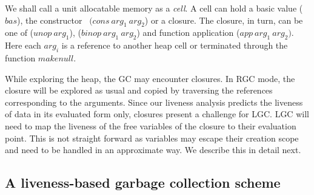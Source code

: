 \documentclass[9pt]{sigplanconf}
\begin{document}
We shall call  a unit allocatable memory as a {\em  cell}.  A cell can
hold  a  basic  value   ($\mathit{bas}$),  the  constructor  \CONS\  $(\mathit{cons~
arg_1~arg_2}$) or   a closure.  The closure, in  turn, can be  one of
($\mathit{unop~arg_1}$),  ($\mathit{ binop~arg_1~arg_2}$)  and  function  application
($\mathit{app~arg_1~arg_2})$.  Here each $\mathit{ arg_i}$ is a reference to another heap
cell or terminated through the function $\mathit{makenull}$.

While exploring the heap, the GC  may encounter closures. In RGC mode,
the closure  will be explored  as usual  and copied by  traversing the
references corresponding to the arguments. Since our liveness analysis
predicts the  liveness of  data in its  evaluated form  only, closures
present a challenge for LGC. LGC will  need to map the liveness of the
free variables of the closure to  their evaluation point.  This is not
straight  forward as  variables may  escape their  creation scope  and
need to  be handled in an  approximate way.  We describe this in detail next.


\subsection{A liveness-based garbage collection scheme}
\label{sec:live-clo}
  \SetStartEndCondition{ }{}{}%
  \AlgoDontDisplayBlockMarkers\SetAlgoNoEnd\SetAlgoNoLine%
\end{document}
